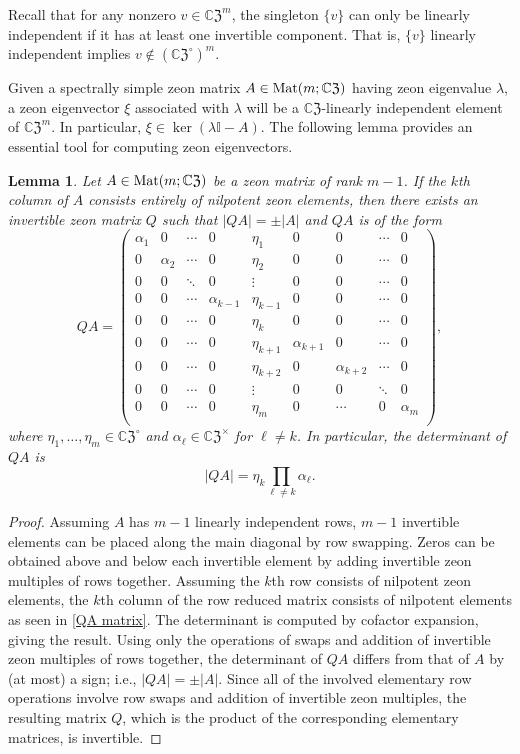 \documentclass{article}
\newtheorem{lemma}[theorem]{Lemma}
\theoremstyle{definition}
\newcommand{\CZ}{\mathbb{C}\mathfrak{Z}}
\newcommand{\Mat}{{\rm Mat}}
\newcommand{\mI}{\mathbb{I}}
\numberwithin{equation}{section}
\begin{document}
Recall that for any nonzero $v\in {\CZ}^m$, the singleton $\{v\}$ can only be linearly independent if it has at least one invertible component.  That is, $\{v\}$ linearly independent implies $v\notin ({\CZ}^\circ)^m$.  

Given a spectrally simple zeon matrix $A\in\Mat(m; \CZ)$ having zeon eigenvalue $\lambda$, a zeon eigenvector $\xi$ associated with $\lambda$ will be a $\CZ$-linearly independent element of $\CZ^m$.  In particular, $\xi\in\ker(\lambda\mI-A)$.  The following lemma provides an essential tool for computing zeon eigenvectors.

\begin{lemma}\label{row reduction I}
Let $A\in\Mat(m;\CZ)$ be a zeon matrix of rank $m-1$.  If the $k$th column of $A$ consists entirely of nilpotent zeon elements, then there exists an invertible zeon matrix $Q$ such that $|QA|=\pm |A|$ and $QA$ is of the form \begin{equation}\label{QA matrix}
QA=\begin{pmatrix}
\alpha_1&0 &\cdots&0&\eta_1&0&0&\cdots&0\\
0&\alpha_2 & \cdots&0&\eta_2&0&0&\cdots&0\\
0&0&\ddots&0&\vdots&0&0&\cdots&0\\
0&0&\cdots&\alpha_{k-1}&\eta_{k-1}&0&0&\cdots&0\\
0&0&\cdots&0&\eta_{k}&0&0&\cdots&0\\
0&0&\cdots&0&\eta_{k+1}&\alpha_{k+1}&0&\cdots&0\\
0&0&\cdots&0&\eta_{k+2}&0&\alpha_{k+2}&\cdots&0\\
0&0&\cdots&0&\vdots&0&0&\ddots&0\\
0&0&\cdots&0&\eta_{m}&0&\cdots&0&\alpha_m\\
\end{pmatrix},
\end{equation}
where $\eta_1, \ldots, \eta_m\in\CZ^\circ$ and $\alpha_\ell\in\CZ^\times$ for $\ell\ne k$.  In particular, the determinant of $QA$ is \begin{equation*}
|QA|=\eta_k\prod_{\ell\ne k}\alpha_\ell.
\end{equation*}
\end{lemma}

\begin{proof}
Assuming $A$ has $m-1$ linearly independent rows, $m-1$ invertible elements can be placed along the main diagonal by row swapping.  Zeros can be obtained above and below each invertible element by adding invertible zeon multiples of rows together.   Assuming the $k$th row consists of nilpotent zeon elements, the $k$th column of the row reduced matrix consists of nilpotent elements as seen in \eqref{QA matrix}.  The determinant is computed by cofactor expansion, giving the result.  Using only the operations of swaps and addition of invertible zeon multiples of rows together, the determinant of $QA$ differs from that of $A$ by (at most) a sign; i.e., $|QA|=\pm |A|$.  Since all of the involved elementary row operations involve row swaps and addition of invertible zeon multiples, the resulting matrix $Q$, which is the product of the corresponding elementary matrices, is invertible.    
\end{proof}
\end{document}
